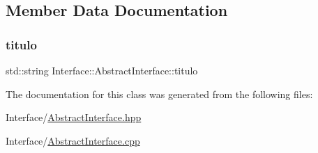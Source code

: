 \subsection{Member Data Documentation}
\mbox{\label{class_interface_1_1_abstract_interface_af2dfb334225b71ddaca86340ed71aa8a}} 
\subsubsection{\texorpdfstring{titulo}{titulo}}
{\footnotesize\ttfamily std\+::string Interface\+::\+Abstract\+Interface\+::titulo\hspace{0.3cm}{\ttfamily [private]}}



The documentation for this class was generated from the following files\+:\begin{DoxyCompactItemize}
\item 
Interface/\hyperlink{_abstract_interface_8hpp}{Abstract\+Interface.\+hpp}\item 
Interface/\hyperlink{_abstract_interface_8cpp}{Abstract\+Interface.\+cpp}\end{DoxyCompactItemize}
